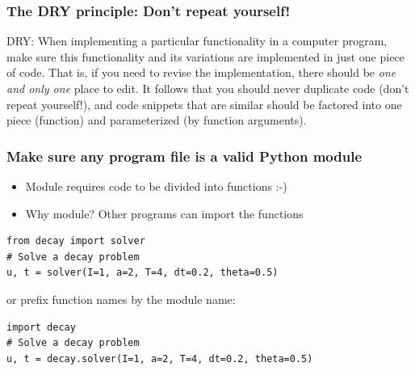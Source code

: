 \documentclass{beamer}
\begin{document}
\begin{frame}
\frametitle{The DRY principle: Don't repeat yourself!}

\begin{block}{DRY: }
When implementing a particular functionality in a computer program, make sure
this functionality and its variations are implemented in just one piece
of code. That is, if you need to revise the implementation, there should be
\emph{one and only one} place to edit. It follows that you should never
duplicate code (don't repeat yourself!), and code snippets that are
similar should be factored into one piece (function) and parameterized (by
function arguments).
\end{block}
\end{frame}

\begin{frame}
\frametitle{Make sure any program file is a valid Python module}

\begin{itemize}
 \item Module requires code to be divided into functions :-)

 \item Why module? Other programs can import the functions
\end{itemize}

\noindent
\begin{verbatim}
from decay import solver
# Solve a decay problem
u, t = solver(I=1, a=2, T=4, dt=0.2, theta=0.5)
\end{verbatim}
or prefix function names by the module name:

\begin{verbatim}
import decay
# Solve a decay problem
u, t = decay.solver(I=1, a=2, T=4, dt=0.2, theta=0.5)
\end{verbatim}
\end{frame}
\end{document}
